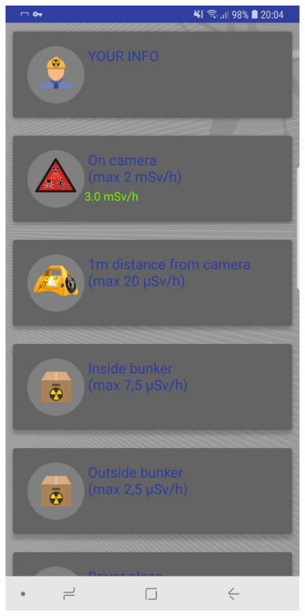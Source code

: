 \begin{figure}[htb]
       \includegraphics[scale=0.2]{img/soft/safetyAlarmForCamera.jpeg}

\end{figure}
